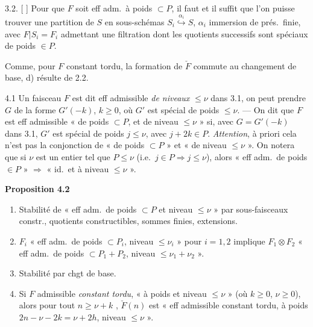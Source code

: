 \documentclass[11pt,a4paper]{article}
\begin{document}
3.2. [ ] Pour que $F$
soit eff adm.\ à poids $\subset P$, il faut et il suffit que l'on
puisse trouver une partition de $S$ en \struck{\ill{}} sous-schémas
$S_{i} \overset{\alpha_{i}}{\hookrightarrow} S$, $\alpha_{i}$ immersion de
prés.\ finie, avec \struck{\ill{}} $F|S_{i} = F_{i}$ admettant une filtration
dont les quotients successifs sont spéciaux de poids $\in P$.

Comme, pour $F$ constant tordu, la formation de $\check{F}$ commute au
changement de base,  d) résulte de 2.2.

4.1 Un faisceau $F$ est dit eff admissible \emph{de niveaux}
$\leqslant \nu$  dans 3.1, on
peut prendre $G$  de la forme $G'(-k)$,
$k \geqslant 0$, où $G'$ est spécial de poids \struck{\ill{}} $\leqslant \nu$.
--- On dit que $F$ est eff admissible « de poids $\subset P$, et de
niveau $\leqslant \nu$ » si, avec \struck{\ill{}} $G = G'(-k)$ dans 3.1, $G'$
est spécial de poids $j \leqslant \nu$, avec $j + 2k \in P$.
\emph{Attention}, à priori cela n'est pas la conjonction de « de poids
$\subset P$ » et « de niveau $\leqslant \nu$ ». \struck{\ill{}} On notera
que si \struck{\ill{}} $\nu$ est \struck{\ill{}} \struck{\ill{}} un entier tel
que $P \leqslant \nu$ (i.e.\ $j \in P \Rightarrow j \leqslant \nu$), alors
« eff adm.\ de poids $\in P$ » $\Rightarrow$ « id.\ et à niveau
$\leqslant \nu$ ».

\textbf{Proposition 4.2}
\begin{enumerate}
\item[a)] Stabilité de « eff adm.\ de poids $\subset P$ et niveau
$\leqslant \nu$ » par sous-faisceaux constr., quotients constructibles,
sommes finies, extensions.
\item[b)] $F_{i}$ « eff adm.\ de poids $\subset P_{i}$, niveau
$\leqslant \nu_{i}$ » pour $i = 1, 2$ implique $F_{1} \otimes F_{2}$
« eff adm.\ de poids $\subset P_{1} + P_{2}$, niveau
$\leqslant \nu_{1} + \nu_{2}$ ».
\item[c)] Stabilité par chgt de base.
\item[d)] Si $F$  admissible \emph{constant tordu}, « à poids
  et niveau $\leqslant \nu$ » (où $k \geqslant 0$,
$\nu \geqslant 0$),  alors pour tout $n \geqslant \nu + k$
, $\check{F}(n)$ est « eff
admissible constant tordu, à poids $2n - \nu - 2k = \nu + 2h$, niveau
$\leqslant \nu$ ».
\end{enumerate}
\end{document}
